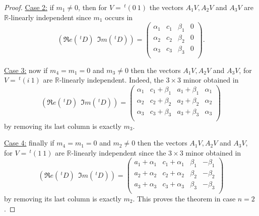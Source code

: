 \documentclass[10pt,a4paper]{amsart}
\newcommand{\R}{\mathbb R}
\newcommand{\transp}{\,^t}
\numberwithin{equation}{section}
\begin{document}
\begin{proof}
\noindent \underline{Case 2:} if $m_1\neq 0$, then for $V=\transp (0 \  1)$ the vectors $A_1V,A_2V$ and $A_3V$ are $\R$-linearly independent since $m_1$ occurs in  
$$(\Re e (\transp D) \ \ \Im m  (\transp D))=
\begin{pmatrix} 
\alpha_1 & c_1  & \beta_1 & 0 \\ 
\alpha_2  & c_2 & \beta_2  & 0 \\ 
 \alpha_3  & c_3 & \beta_3& 0 \\ 

\end{pmatrix}.$$ 

\noindent \underline{Case 3:} now if $m_4=m_1=0$ and $m_3\neq 0$ then the vectors $A_1V,A_2V$ and $A_3V$, for $V=\transp (i \  1)$ are $\R$-linearly independent.  Indeed, the $3\times 3$ minor obtained in 
 $$(\Re e (\transp D) \ \ \Im m  (\transp D))=
\begin{pmatrix} 
\alpha_1 & c_1+\beta_1  & a_1+\beta_1 & \alpha_1 \\ 
\alpha_2  & c_2+\beta_2& a_2+\beta_2   & \alpha_2 \\ 
 \alpha_3  &c_3+\beta_3 & a_3+\beta_3 & \alpha_3 \\ 
\end{pmatrix} $$ 
 by removing its last column is exactly $m_3$.  

\noindent \underline{Case 4:} finally if $m_4=m_1=0$ and $m_2\neq 0$ then the vectors $A_1V,A_2V$ and $A_3V$, for $V=\transp (1 \  1)$ are $\R$-linearly independent since  the $3\times 3$ minor obtained in 
 $$(\Re e (\transp D) \ \ \Im m  (\transp D))=
\begin{pmatrix} 
a_1+\alpha_1 &  c_1+ \alpha_1 & \beta_1  &  -\beta_1 \\ 
a_2+\alpha_2 &  c_2+ \alpha_2  & \beta_2& -\beta_2 \\ 
a_3+\alpha_3 &   c_3+ \alpha_3  &\beta_3 & -\beta_3 \\ 
\end{pmatrix} $$ 
by removing its last column is exactly $m_2$. This proves the theorem in case $n=2$.    
         
\vspace{0.5cm}         
         


\end{proof}
\end{document}
